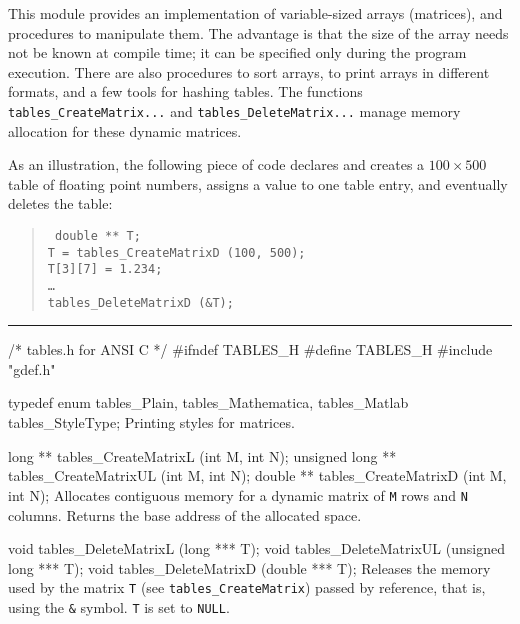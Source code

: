 
This module provides an implementation of variable-sized arrays (matrices),
and procedures to manipulate them.
The advantage is that the size of the array needs not be known
at compile time; it can be specified only during the program execution.
There are also procedures to sort arrays,  to
print  arrays in different formats,
and a few tools for hashing tables.
The functions {\tt tables\_CreateMatrix...} and
{\tt tables\_DeleteMatrix...} manage memory allocation for
these dynamic matrices.

As an illustration, the following piece of code declares and creates
a $100\times 500$ table of floating point numbers, assigns a value
to one table entry, and eventually deletes the table:
  \begin{verse}{\tt
    double ** T;\\
    T = tables\_CreateMatrixD (100, 500);\\
    T[3][7] = 1.234;\\
    \dots \\
    tables\_DeleteMatrixD (\&T);
  }\end{verse}

\bigskip\hrule
\code\hide
/* tables.h for ANSI C */
#ifndef TABLES_H
#define TABLES_H
\endhide
#include "gdef.h"
\endcode

\code

typedef enum {
   tables_Plain,
   tables_Mathematica,
   tables_Matlab
   } tables_StyleType;
\endcode
  \tab Printing styles for matrices.
  \endtab

\code

long ** tables_CreateMatrixL  (int M, int N);
unsigned long ** tables_CreateMatrixUL (int M, int N);
double ** tables_CreateMatrixD  (int M, int N);
\endcode
  \tab Allocates contiguous memory for a dynamic
  matrix of {\tt M} rows and {\tt N} columns. Returns the base
  address of the allocated space.
  \endtab
\code


void tables_DeleteMatrixL  (long *** T);
void tables_DeleteMatrixUL (unsigned long *** T);
void tables_DeleteMatrixD  (double *** T);
\endcode
  \tab Releases the memory used by the matrix {\tt T}
  (see {\tt tables\_CreateMatrix}) passed by
  reference, that is, using the {\tt \&} symbol.
  {\tt T} is set to {\tt NULL}.
  \endtab
\code


